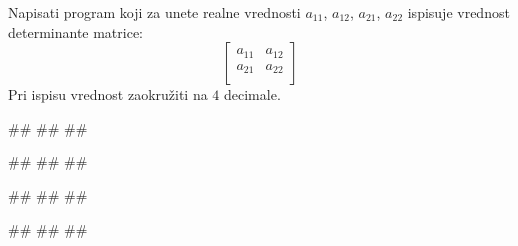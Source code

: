 \begin{Exercise}[label=p1.10_]
Napisati program koji za unete realne vrednosti $a_{11}$, $a_{12}$, $a_{21}$, $a_{22}$  ispisuje vrednost determinante matrice:
\[
 \begin{bmatrix}
  a_{11} & a_{12} \\
  a_{21} & a_{22} \\
 \end{bmatrix}
\]
Pri ispisu vrednost zaokružiti na $4$ decimale.

\begin{miditest}
\begin{upotreba}{1}
#\naslovInt#
##
##
\end{upotreba}
\end{miditest}
\begin{miditest}
\begin{upotreba}{2}
#\naslovInt#
##
##
\end{upotreba}
\end{miditest}

\begin{miditest}
\begin{upotreba}{3}
#\naslovInt#
##
##
\end{upotreba}
\end{miditest}
\begin{miditest}
\begin{upotreba}{4}
#\naslovInt#
##
##
\end{upotreba}
\end{miditest}
\end{Exercise}


